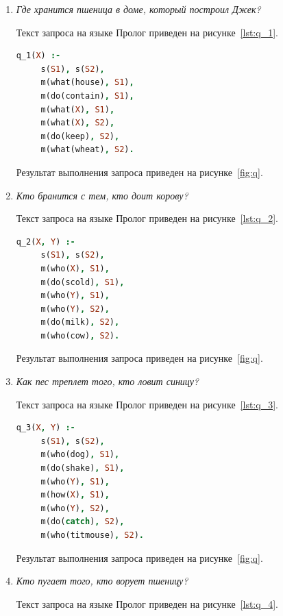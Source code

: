 \begin{enumerate}
\item \textit{Где хранится пшеница в доме, который построил Джек?}

  Текст запроса на языке Пролог приведен на рисунке~\ref{lst:q_1}.

  \begin{lstlisting}[style=source_code,language=prolog,
    caption=Текст запроса,label=lst:q_1]
 q_1(X) :-
     s(S1), s(S2),
     m(what(house), S1),
     m(do(contain), S1),
     m(what(X), S1),
     m(what(X), S2),
     m(do(keep), S2),
     m(what(wheat), S2).
  \end{lstlisting}

  Результат выполнения запроса приведен на рисунке~\ref{fig:q}.

\item \textit{Кто бранится с тем, кто доит корову?}

  Текст запроса на языке Пролог приведен на рисунке~\ref{lst:q_2}.

  \begin{lstlisting}[style=source_code,language=prolog,
    caption=Текст запроса,label=lst:q_2]
 q_2(X, Y) :-
     s(S1), s(S2),
     m(who(X), S1),
     m(do(scold), S1),
     m(who(Y), S1),
     m(who(Y), S2),
     m(do(milk), S2),
     m(who(cow), S2).
  \end{lstlisting}

  Результат выполнения запроса приведен на рисунке~\ref{fig:q}.

\newpage

\item \textit{Как пес треплет того, кто ловит синицу?}

  Текст запроса на языке Пролог приведен на рисунке~\ref{lst:q_3}.

  \begin{lstlisting}[style=source_code,language=prolog,
    caption=Текст запроса,label=lst:q_3]
 q_3(X, Y) :-
     s(S1), s(S2),
     m(who(dog), S1),
     m(do(shake), S1),
     m(who(Y), S1),
     m(how(X), S1),
     m(who(Y), S2),
     m(do(catch), S2),
     m(who(titmouse), S2).
  \end{lstlisting}

  Результат выполнения запроса приведен на рисунке~\ref{fig:q}.

\item \textit{Кто пугает того, кто ворует пшеницу?}

  Текст запроса на языке Пролог приведен на рисунке~\ref{lst:q_4}.


\end{enumerate}
